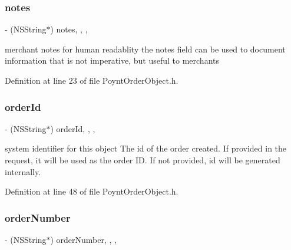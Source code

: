 \subsubsection{\texorpdfstring{notes}{notes}}
{\footnotesize\ttfamily -\/ (N\+S\+String$\ast$) notes\hspace{0.3cm}{\ttfamily [read]}, {\ttfamily [write]}, {\ttfamily [nonatomic]}, {\ttfamily [copy]}}



merchant notes for human readablity  the notes field can be used to document information that is not imperative, but useful to merchants 



Definition at line 23 of file Poynt\+Order\+Object.\+h.

\hypertarget{interface_poynt_order_object_aac2b120e80b4b9e69c3a577c4f31ed31}{}\label{interface_poynt_order_object_aac2b120e80b4b9e69c3a577c4f31ed31} 
\subsubsection{\texorpdfstring{order\+Id}{orderId}}
{\footnotesize\ttfamily -\/ (N\+S\+String$\ast$) order\+Id\hspace{0.3cm}{\ttfamily [read]}, {\ttfamily [write]}, {\ttfamily [nonatomic]}, {\ttfamily [copy]}}



system identifier for this object  The id of the order created. If provided in the request, it will be used as the order ID. If not provided, id will be generated internally. 



Definition at line 48 of file Poynt\+Order\+Object.\+h.

\hypertarget{interface_poynt_order_object_add3af147d846009706270bf6315b1229}{}\label{interface_poynt_order_object_add3af147d846009706270bf6315b1229} 
\subsubsection{\texorpdfstring{order\+Number}{orderNumber}}
{\footnotesize\ttfamily -\/ (N\+S\+String$\ast$) order\+Number\hspace{0.3cm}{\ttfamily [read]}, {\ttfamily [write]}, {\ttfamily [nonatomic]}, {\ttfamily [copy]}}



